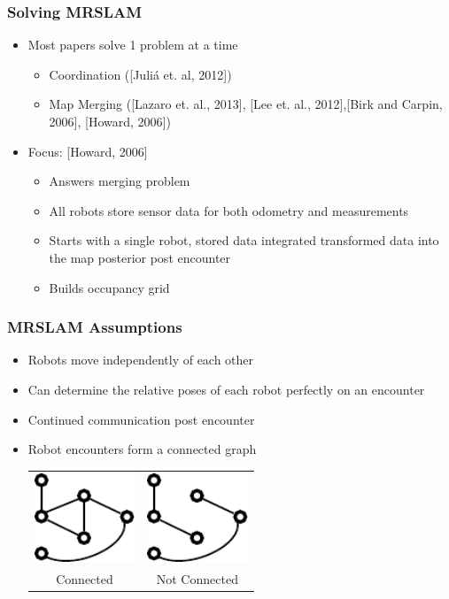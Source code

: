 \begin{frame}
\frametitle{Solving MRSLAM}
\begin{itemize}
\item Most papers solve 1 problem at a time
\begin{itemize}
\item Coordination ([Juli{\'a} et. al, 2012])
\item Map Merging ([Lazaro et. al., 2013], [Lee et. al., 2012],[Birk and Carpin, 2006], [Howard, 2006])
\end{itemize}
\item Focus: [Howard, 2006]
\begin{itemize}
\item Answers merging problem
\item All robots store sensor data for both odometry and measurements
\item Starts with a single robot, stored data integrated transformed data into the map posterior post encounter
\item Builds occupancy grid

\end{itemize}

\end{itemize}
\end{frame}


\begin{frame}
\frametitle{MRSLAM Assumptions}
\begin{itemize}
\item Robots move independently of each other
\item Can determine the relative poses of each robot perfectly on an encounter
\item Continued communication post encounter
\item Robot encounters form a connected graph
\begin{center}
\begin{tabular}{cc}
\includegraphics[width=3cm]{../FiguresAndMovies/ConnectedGraph}&\includegraphics[width=3cm]{../FiguresAndMovies/NonConnected}\\
Connected & Not Connected
\end{tabular}
\end{center}
\end{itemize}
\end{frame}



